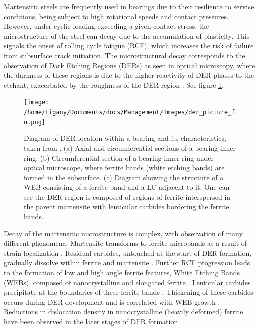 \documentclass[a4paper,11pt]{article}
\begin{document}
Martensitic steels are frequently used in bearings due to their resilience to service conditions,
being subject to high rotational speeds and contact pressures. However, under cyclic loading
exceeding a given contact stress, the microstructure of the steel can decay due to the accumulation
of plasticity. This signals the onset of rolling cycle fatigue (RCF), which increases the risk of
failure from subsurface crack initiation. The microstructural decay corresponds to the observation
of Dark Etching Regions (DERs) as seen in optical microscopy, where the darkness of these regions is due
to the higher reactivity of DER phases to the etchant; exacerbated by
the roughness of the DER region \cite{skf2019}. See figure \ref{fuderpicture}.

\begin{figure}[htbp]
\centering
\texttt{[image: /home/tigany/Documents/docs/Management/Images/der\_picture\_fu.png]}
\caption{Diagram of DER location within a bearing and its characteristics, taken from \cite{Fu2017}. (a) Axial and circumferential sections of a bearing inner ring. (b) Circumferential section of a bearing inner ring under optical microscope, where ferrite bands (white etching bands) are formed in the subsurface. (c) Diagram showing the structure of a WEB consisting of a ferrite band and a LC adjacent to it. One can see the DER region is composed of regions of ferrite interspersed in the parent martensite with lenticular carbides bordering the ferrite bands. \label{fuderpicture}}
\end{figure}


Decay of the martensitic microstructure is complex, with observation of many different
phenomena. Martensite transforms to ferrite microbands as a result of strain localization
\cite{Fu2017,il_micros_alter_rollin_contac_fatig,jonesil_metal_obser_ball_bearin_fatig_phenom,70_micros_microh_resid_stres_chang,Swahn1976,Voskamp1997,voskamp97_state_resid_stres_induc_by,polonsky95_white_etchin_band_format_rollin_bearin,vsmelova17_elect_micros_inves_micros_alter}. Residual
carbides, untouched at the start of DER formation, gradually dissolve within ferrite and
martensite \cite{70_micros_microh_resid_stres_chang,Swahn1976,Osterlund_1980}. Further RCF
progression leads to the formation of low and high angle ferrite features, White Etching Bands
(WEBs), composed of nanocrystalline \cite{Voskamp1997,Osterlund_1980,Mitamura_2007} and elongated
ferrite \cite{vsmelova17_elect_micros_inves_micros_alter}. Lenticular carbides precipitate at the
boundaries of these ferrite bands \cite{Swahn1976,Osterlund_1980}. Thickening of these carbides
occurs during DER development and is correlated with WEB growth
\cite{Fu2017,fu17_strain_induc_marten_decay_bearin,Warhadpande1_2013,Warhadpande2013}. Reductions in
dislocation density in nanocrystalline (heavily deformed) ferrite have been observed in the later
stages of DER formation \cite{skf2019,voskamp80_gradual_chang_resid_stres_micros}.
\end{document}
